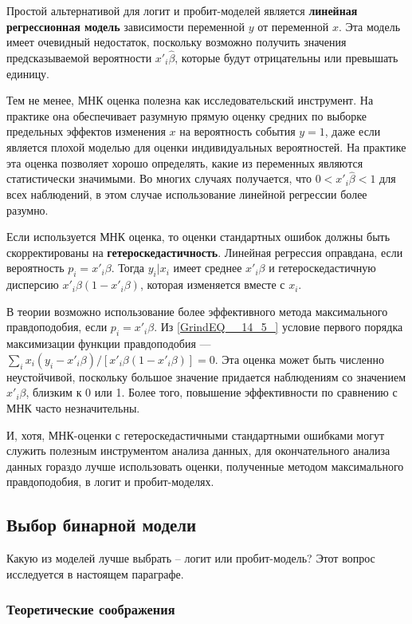 Простой альтернативой для логит и пробит-моделей является \textbf{линейная регрессионная модель }зависимости переменной $y$ от переменной $x$. Эта модель имеет очевидный недостаток,  поскольку возможно получить значения предсказываемой вероятности $x'_i\widehat\beta$, которые будут отрицательны или превышать единицу.

Тем не менее,  МНК оценка полезна как исследовательский инструмент. На практике она обеспечивает разумную прямую оценку средних по выборке предельных эффектов изменения $x$ на вероятность события $y=1$, даже если является плохой моделью для оценки индивидуальных вероятностей. На практике эта оценка позволяет хорошо определять, какие из переменных являются статистически значимыми. Во многих случаях получается,  что $0<x'_i\widehat\beta<1$ для всех наблюдений, в этом случае использование линейной регрессии более разумно.

Если используется МНК оценка,  то оценки стандартных ошибок должны быть скорректированы на  \textbf{гетероскедастичность}. Линейная регрессия оправдана,  если вероятность $p_i=x'_i\beta$. Тогда $y_i|x_i$ имеет среднее $x'_i\beta $ и гетероскедастичную дисперсию $x'_i\beta (1-x'_i\beta)$,  которая изменяется вместе с $x_i$.

В теории возможно использование более эффективного метода максимального правдоподобия,  если $p_i=x'_i\beta$. Из \eqref{GrindEQ__14_5_} условие первого порядка максимизации функции правдоподобия --- $\sum_i x_i(y_i-x'_i\beta )/[x'_i\beta (1-x'_i\beta)]=0$. Эта оценка может быть численно неустойчивой,  поскольку большое значение придается наблюдениям со значением $x'_i\beta$,  близким к 0 или 1. Более того,  повышение эффективности по сравнению с МНК часто незначительны.

И, хотя, МНК-оценки с гетероскедастичными стандартными ошибками могут служить полезным инструментом анализа данных,  для окончательного анализа данных гораздо лучше использовать оценки,  полученные методом максимального правдоподобия,  в логит и пробит-моделях.

\subsection{Выбор бинарной модели}

Какую из моделей лучше выбрать -- логит или пробит-модель? Этот вопрос исследуется в настоящем параграфе.

\subsubsection*{Теоретические соображения}

